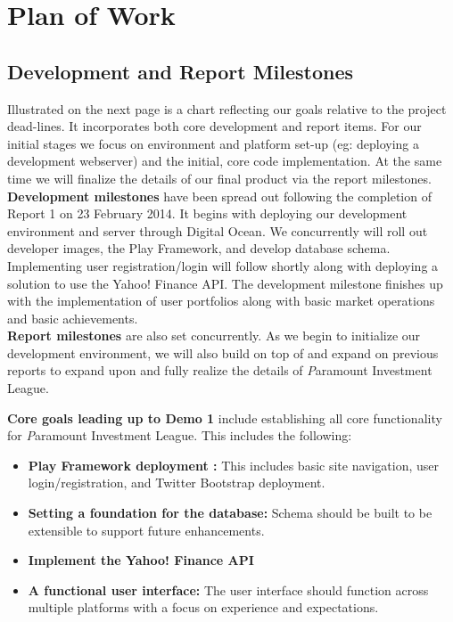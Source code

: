 \chapter{Plan of Work}

\section{Development and Report Milestones}

Illustrated on the next page is a chart reflecting our goals relative to the
project dead-lines. It incorporates both core development and report items. For
our initial stages we focus on environment and platform set-up (eg: deploying a
development webserver) and the initial, core code implementation. At the same time
we will finalize the details of our final product via the report milestones.\\

{\bfseries Development milestones} have been spread out following the completion
of Report 1 on 23 February 2014.  It begins with deploying our development
environment and server through Digital Ocean\cite{wiki:do}.
We concurrently will roll out developer
images, the Play Framework\cite{wiki:play}, and develop database schema. Implementing user
registration/login will follow shortly along with deploying a solution to use the
Yahoo! Finance API. The development milestone finishes up with the implementation of
user portfolios along with basic market operations and basic achievements.\\

{\bfseries Report milestones} are also set concurrently. As we begin to initialize
our development environment, we will also build on top of and expand on previous
reports to expand upon and fully realize the details of
{\textit Paramount Investment League}.

{\bfseries Core goals leading up to Demo 1} include establishing all core
functionality for {\textit Paramount Investment League}. This includes the following:
\begin{itemize}
\item {\bfseries Play Framework deployment :} This includes basic site navigation,
user login/registration, and Twitter Bootstrap deployment.
\item {\bfseries Setting a foundation for the database: } Schema should be built
to be extensible to support future enhancements.
\item {\bfseries Implement the Yahoo! Finance API}
\item {\bfseries A functional user interface:} The user interface should function
across multiple platforms with a focus on experience and expectations. \\
\end{itemize}

